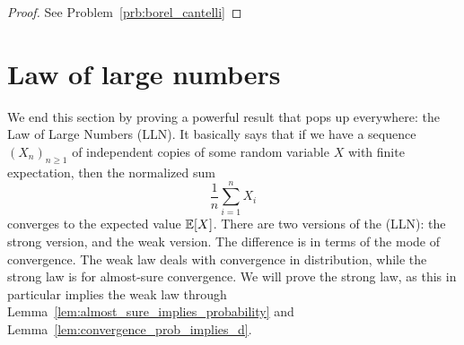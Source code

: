 \begin{proof}
See Problem~\ref{prb:borel_cantelli}
\end{proof}


\section{Law of large numbers}

We end this section by proving a powerful result that pops up everywhere: the Law of Large Numbers (LLN). It basically says that if we have a sequence $(X_n)_{n \ge 1}$ of independent copies of some random variable $X$ with finite expectation, then the normalized sum
\[
	\frac{1}{n} \sum_{i = 1}^n X_i
\]
converges to the expected value $\mathbb E[X]$. There are two versions of the (LLN): the strong version, and the weak version. The difference is in terms of the mode of convergence. The weak law deals with convergence in distribution, while the strong law is for almost-sure convergence. We will prove the strong law, as this in particular implies the weak law through Lemma~\ref{lem:almost_sure_implies_probability} and Lemma~\ref{lem:convergence_prob_implies_d}.


